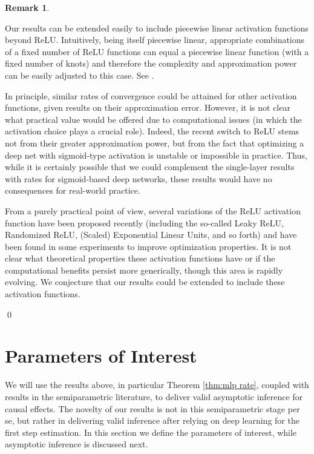 \documentclass[11pt]{article}
\numberwithin{equation}{section}
\theoremstyle{definition}
\newtheorem{remarkTmp}{Remark}
\newenvironment{remark}
	{\medskip  \begin{remarkTmp} 	}
	{ 
		\renewcommand{\qedsymbol}{$\lrcorner$}
		\qed 
		\end{remarkTmp} 
	}
\begin{document}
\begin{remark}
	\label{rem:activation}
	
	Our results can be extended easily to include piecewise linear activation functions beyond ReLU. Intuitively, being itself piecewise linear, appropriate combinations of a fixed number of ReLU functions can equal a piecewise linear function (with a fixed number of knots) and therefore the complexity and approximation power can be easily adjusted to this case. See \cite{Bartlett-etal2017_COLT}. 
	
	In principle, similar rates of convergence could be attained for other activation functions, given results on their approximation error. However, it is not clear what practical value would be offered due to computational issues (in which the activation choice plays a crucial role). Indeed, the recent switch to ReLU stems not from their greater approximation power, but from the fact that optimizing a deep net with sigmoid-type activation is unstable or impossible in practice. Thus, while it is certainly possible that we could complement the single-layer results with rates for sigmoid-based deep networks, these results would have no consequences for real-world practice.
	
	From a purely practical point of view, several variations of the ReLU activation function have been proposed recently (including the so-called Leaky ReLU, Randomized ReLU, (Scaled) Exponential Linear Units, and so forth) and have been found in some experiments to improve optimization properties. It is not clear what theoretical properties these activation functions have or if the computational benefits persist more generically, though this area is rapidly evolving. We conjecture that our results could be extended to include these activation functions.
\end{remark}











\section{Parameters of Interest}
	\label{sec:params}




We will use the results above, in particular Theorem \ref{thm:mlp rate}, coupled with results in the semiparametric literature, to deliver valid asymptotic inference for causal effects. The novelty of our results is not in this semiparametric stage per se, but rather in delivering valid inference after relying on deep learning for the first step estimation. In this section we define the parameters of interest, while asymptotic inference is discussed next. 
\end{document}
